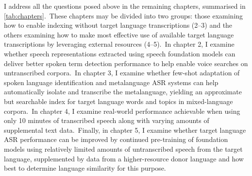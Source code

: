 \documentclass[main.tex]{subfiles}
\begin{document}
\begin{table}[!b]
\centering
\renewcommand{\arraystretch}{1.35}
\caption{Language documentation scenarios according to amount of available transcriptions and composition of speech corpus addressed in the different chapters in the dissertation.~Initialisms: Spoken Language Identification (SLI), Automatic Speech Recognition (ASR).}
\label{tab:chapters}
\end{table}

I address all the questions posed above in the remaining chapters, summarised in \ref{tab:chapters}.~These chapters may be divided into two groups: those examining how to enable indexing without target language transcriptions (2--3) and the others examining how to make most effective use of available target language transcriptions by leveraging external resources (4--5).~In chapter 2, I examine whether speech representations extracted using speech foundation models can deliver better spoken term detection performance to help enable voice searches on untranscribed corpora.~In chapter 3, I examine whether few-shot adaptation of spoken language identification and metalanguage ASR systems can help automatically isolate and transcribe the metalanguage, yielding an approximate but searchable index for target language words and topics in mixed-language corpora.~In chapter 4, I examine real-world performance achievable when using only 10 minutes of transcribed speech along with varying amounts of supplemental text data.~Finally, in chapter 5, I examine whether target language ASR performance can be improved by continued pre-training of foundation models using relatively limited amounts of untranscribed speech from the target language, supplemented by data from a higher-resource donor language and how best to determine language similarity for this purpose.
\end{document}
